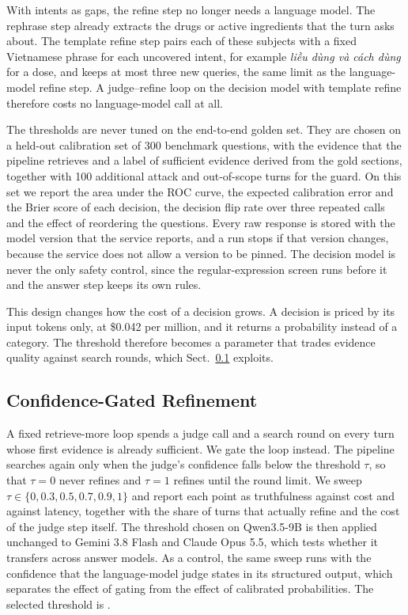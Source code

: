 With intents as gaps, the refine step no longer needs a language model. The rephrase step already extracts the drugs or active ingredients that the turn asks about. The template refine step pairs each of these subjects with a fixed Vietnamese phrase for each uncovered intent, for example \textit{liều dùng và cách dùng} for a dose, and keeps at most three new queries, the same limit as the language-model refine step. A judge--refine loop on the decision model with template refine therefore costs no language-model call at all.

The thresholds are never tuned on the end-to-end golden set. They are chosen on a held-out calibration set of 300 benchmark questions, with the evidence that the pipeline retrieves and a label of sufficient evidence derived from the gold sections, together with 100 additional attack and out-of-scope turns for the guard. On this set we report the area under the ROC curve, the expected calibration error and the Brier score of each decision, the decision flip rate over three repeated calls and the effect of reordering the questions. Every raw response is stored with the model version that the service reports, and a run stops if that version changes, because the service does not allow a version to be pinned. The decision model is never the only safety control, since the regular-expression screen runs before it and the answer step keeps its own rules.

This design changes how the cost of a decision grows. A decision is priced by its input tokens only, at \$0.042 per million, and it returns a probability instead of a category. The threshold therefore becomes a parameter that trades evidence quality against search rounds, which Sect.~\ref{sec:gating} exploits.

\subsection{Confidence-Gated Refinement}\label{sec:gating}

A fixed retrieve-more loop spends a judge call and a search round on every turn whose first evidence is already sufficient. We gate the loop instead. The pipeline searches again only when the judge's confidence falls below the threshold $\tau$, so that $\tau=0$ never refines and $\tau=1$ refines until the round limit. We sweep $\tau\in\{0,0.3,0.5,0.7,0.9,1\}$ and report each point as truthfulness against cost and against latency, together with the share of turns that actually refine and the cost of the judge step itself. %
The threshold chosen on Qwen3.5-9B is then applied unchanged to Gemini 3.8 Flash and Claude Opus 5.5, which tests whether it transfers across answer models. As a control, the same sweep runs with the confidence that the language-model judge states in its structured output, which separates the effect of gating from the effect of calibrated probabilities. The selected threshold is .

